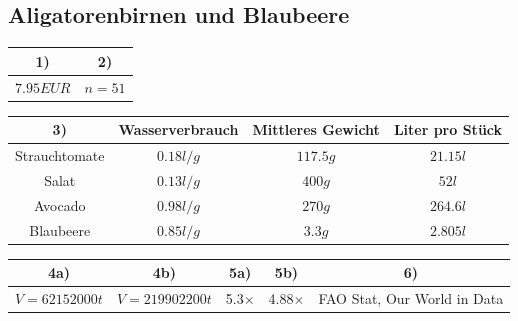 \documentclass[a4paper, 9pt]{scrartcl}\usepackage[]{graphicx}\usepackage[]{xcolor}
\newenvironment{knitrout}{}{} %
\begin{document}
\subsection*{Aligatorenbirnen und Blaubeere}
\begin{knitrout}
\color{fgcolor}\begin{table}[!h]
\centering\begingroup\fontsize{10}{12}\selectfont

\begin{tabular}{cc}
\toprule
\textbf{1)} & \textbf{2)}\\
\midrule
$7.95EUR$ & $n = 51$\\
\bottomrule
\end{tabular}
\endgroup{}
\end{table}

\begin{table}[!h]
\centering\begingroup\fontsize{10}{12}\selectfont

\begin{tabular}{cccc}
\toprule
\textbf{3)} & \textbf{Wasserverbrauch} & \textbf{Mittleres Gewicht} & \textbf{Liter pro Stück}\\
\midrule
Strauchtomate & $0.18l/g$ & $117.5g$ & $21.15l$\\
Salat & $0.13l/g$ & $400g$ & $52l$\\
Avocado & $0.98l/g$ & $270g$ & $264.6l$\\
Blaubeere & $0.85l/g$ & $3.3g$ & $2.805l$\\
\bottomrule
\end{tabular}
\endgroup{}
\end{table}

\begin{table}[!h]
\centering\begingroup\fontsize{10}{12}\selectfont

\begin{tabular}{ccccc}
\toprule
\textbf{4a)} & \textbf{4b)} & \textbf{5a)} & \textbf{5b)} & \textbf{6)}\\
\midrule
$V = 62152000t$ & $V = 219902200t$ & 5.3$\times$ & 4.88$\times$ & FAO Stat, Our World in Data\\
\bottomrule
\end{tabular}
\endgroup{}
\end{table}

\end{knitrout}
\end{document}

